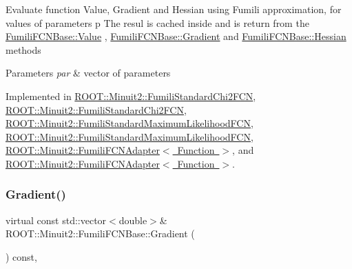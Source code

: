 Evaluate function Value, Gradient and Hessian using Fumili approximation, for values of parameters p The resul is cached inside and is return from the \mbox{\hyperlink{classROOT_1_1Minuit2_1_1FumiliFCNBase_a221dacee0ccde747a271a0cecd759f98}{Fumili\+F\+C\+N\+Base\+::\+Value}} , \mbox{\hyperlink{classROOT_1_1Minuit2_1_1FumiliFCNBase_ad226939ea2e83f754b5a6afc30876d3e}{Fumili\+F\+C\+N\+Base\+::\+Gradient}} and \mbox{\hyperlink{classROOT_1_1Minuit2_1_1FumiliFCNBase_ade134d8c6613393e942ef98d445db376}{Fumili\+F\+C\+N\+Base\+::\+Hessian}} methods


\begin{DoxyParams}{Parameters}
{\em par} & vector of parameters \\
\hline
\end{DoxyParams}


Implemented in \mbox{\hyperlink{classROOT_1_1Minuit2_1_1FumiliStandardChi2FCN_a76f42b6e5d2a92961a9fd8feca38b582}{R\+O\+O\+T\+::\+Minuit2\+::\+Fumili\+Standard\+Chi2\+F\+CN}}, \mbox{\hyperlink{classROOT_1_1Minuit2_1_1FumiliStandardChi2FCN_ace15dd1aad435e460c523bc37bff12a8}{R\+O\+O\+T\+::\+Minuit2\+::\+Fumili\+Standard\+Chi2\+F\+CN}}, \mbox{\hyperlink{classROOT_1_1Minuit2_1_1FumiliStandardMaximumLikelihoodFCN_a1faea776f7da3c238e522748b573caab}{R\+O\+O\+T\+::\+Minuit2\+::\+Fumili\+Standard\+Maximum\+Likelihood\+F\+CN}}, \mbox{\hyperlink{classROOT_1_1Minuit2_1_1FumiliStandardMaximumLikelihoodFCN_a37e72fc87092e5699066098fa5a31235}{R\+O\+O\+T\+::\+Minuit2\+::\+Fumili\+Standard\+Maximum\+Likelihood\+F\+CN}}, \mbox{\hyperlink{classROOT_1_1Minuit2_1_1FumiliFCNAdapter_a75bacae09c510900a45ea753afae971a}{R\+O\+O\+T\+::\+Minuit2\+::\+Fumili\+F\+C\+N\+Adapter$<$ Function $>$}}, and \mbox{\hyperlink{classROOT_1_1Minuit2_1_1FumiliFCNAdapter_a75bacae09c510900a45ea753afae971a}{R\+O\+O\+T\+::\+Minuit2\+::\+Fumili\+F\+C\+N\+Adapter$<$ Function $>$}}.

\mbox{\label{classROOT_1_1Minuit2_1_1FumiliFCNBase_ad226939ea2e83f754b5a6afc30876d3e}} 
\subsubsection{\texorpdfstring{Gradient()}{Gradient()}\hspace{0.1cm}{\footnotesize\ttfamily [1/4]}}
{\footnotesize\ttfamily virtual const std\+::vector$<$double$>$\& R\+O\+O\+T\+::\+Minuit2\+::\+Fumili\+F\+C\+N\+Base\+::\+Gradient (\begin{DoxyParamCaption}{ }\end{DoxyParamCaption}) const\hspace{0.3cm}{\ttfamily [inline]}, {\ttfamily [virtual]}}

